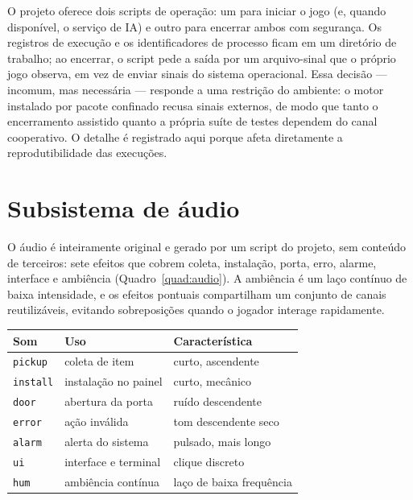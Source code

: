 O projeto oferece dois scripts de operação: um para iniciar o jogo (e,
quando disponível, o serviço de IA) e outro para encerrar ambos com segurança.
Os registros de execução e os identificadores de processo ficam em um
diretório de trabalho; ao encerrar, o script pede a saída por um arquivo-sinal
que o próprio jogo observa, em vez de enviar sinais do sistema operacional.
Essa decisão --- incomum, mas necessária --- responde a uma restrição do
ambiente: o motor instalado por pacote confinado recusa sinais externos, de
modo que tanto o encerramento assistido quanto a própria suíte de testes
dependem do canal cooperativo. O detalhe é registrado aqui porque afeta
diretamente a reprodutibilidade das execuções.

\section{Subsistema de áudio}
\label{sec:audio_dev}

O áudio é inteiramente original e gerado por um script do projeto, sem
conteúdo de terceiros: sete efeitos que cobrem coleta, instalação, porta,
erro, alarme, interface e ambiência (Quadro~\ref{quad:audio}). A ambiência é
um laço contínuo de baixa intensidade, e os efeitos pontuais compartilham um
conjunto de canais reutilizáveis, evitando sobreposições quando o jogador
interage rapidamente.

\begin{quadro}[htbp]
\centering
\caption{Catálogo de sons do jogo (gerados por script próprio).}
\label{quad:audio}
\footnotesize
\begin{tabular}{@{}>{\raggedright\arraybackslash}p{2.2cm} >{\raggedright\arraybackslash}p{5.4cm} >{\raggedright\arraybackslash}p{5.2cm}@{}}
\toprule
Som & Uso & Característica \\
\midrule
\texttt{pickup} & coleta de item & curto, ascendente \\
\texttt{install} & instalação no painel & curto, mecânico \\
\texttt{door} & abertura da porta & ruído descendente \\
\texttt{error} & ação inválida & tom descendente seco \\
\texttt{alarm} & alerta do sistema & pulsado, mais longo \\
\texttt{ui} & interface e terminal & clique discreto \\
\texttt{hum} & ambiência contínua & laço de baixa frequência \\
\bottomrule
\end{tabular}
\par\vspace{2pt}{\footnotesize Fonte: elaborado pelo autor (2026), a partir do gerador de áudio do projeto.}
\end{quadro}

